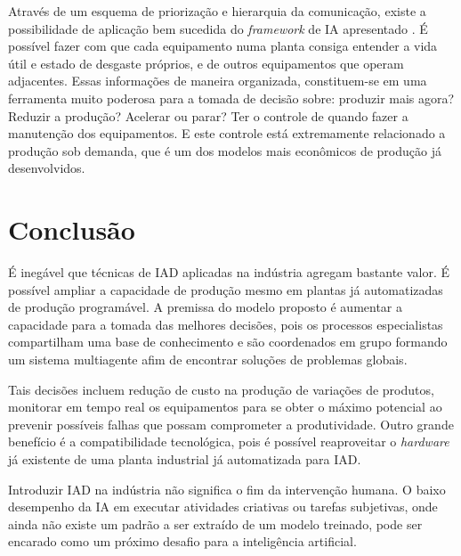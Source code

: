 \documentclass[
	article,			    %
	12pt,				    %
	oneside,			    %
	a4paper,			    %
	chapter=TITLE,		    %
	section=TITLE,		    %
	subsection=TITLE,	    %
	english,			    %
	brazil,				    %
	sumario=tradicional
]{abntex2}
\begin{document}
Através de um esquema de priorização e hierarquia da comunicação, existe a possibilidade de aplicação bem sucedida do \emph{framework} de IA apresentado \cite{leejay4.0manufacturing}. É possível fazer com que cada equipamento numa planta consiga entender a vida útil e estado de desgaste próprios, e de outros equipamentos que operam adjacentes. Essas informações de maneira organizada, constituem-se em uma ferramenta muito poderosa para a tomada de decisão sobre: produzir mais agora? Reduzir a produção? Acelerar ou parar? Ter o controle de quando fazer a manutenção dos equipamentos. E este controle está extremamente relacionado a produção sob demanda, que é um dos modelos mais econômicos de produção já desenvolvidos.

\section{Conclusão}
É inegável que técnicas de IAD aplicadas na indústria agregam bastante valor. É possível ampliar a capacidade de produção mesmo em plantas já automatizadas de produção programável. A premissa do modelo proposto é aumentar a capacidade para a tomada das melhores decisões, pois os processos especialistas compartilham uma base de conhecimento e são coordenados em grupo formando um sistema multiagente afim de encontrar soluções de problemas globais.  

Tais decisões incluem redução de custo na produção de variações de produtos, monitorar em tempo real os equipamentos para se obter o máximo potencial ao prevenir possíveis falhas que possam comprometer a produtividade. Outro grande benefício é a compatibilidade tecnológica, pois é possível reaproveitar o \emph{hardware} já existente de uma planta industrial já automatizada para IAD.

Introduzir IAD na indústria não significa o fim da intervenção humana. O baixo desempenho da IA em executar atividades criativas ou tarefas subjetivas, onde ainda não existe um padrão a ser extraído de um modelo treinado, pode ser encarado como um próximo desafio para a inteligência artificial. 
\end{document}
